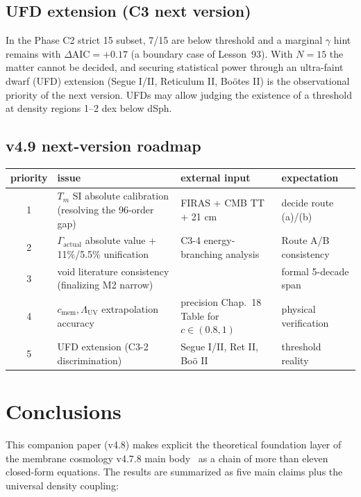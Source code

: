 \documentclass[11pt,a4paper]{article}
\newcommand{\cmem}{c_{\mathrm{mem}}}
\newcommand{\Tm}{T_{m}}
\newcommand{\Lambdauv}{\Lambda_{\mathrm{UV}}}
\newcommand{\Gammaact}{\Gamma_{\mathrm{actual}}}
\newcommand{\AIC}{\Delta\mathrm{AIC}}
\begin{document}
\subsection{UFD extension (C3 next version)}
In the Phase C2 strict 15 subset, 7/15 are below threshold and a marginal $\gamma$ hint remains with
$\AIC = +0.17$ (a boundary case of Lesson~93). With $N = 15$ the matter cannot be decided, and
securing statistical power through an ultra-faint dwarf (UFD) extension (Segue I/II, Reticulum II,
Boötes II) is the observational priority of the next version. UFDs may allow judging the existence
of a threshold at density regions 1--2 dex below dSph.

\subsection{v4.9 next-version roadmap}
\begin{center}\small
\begin{tabularx}{\linewidth}{@{}c >{\raggedright\arraybackslash}X >{\raggedright\arraybackslash}X >{\raggedright\arraybackslash}X@{}}
\toprule
priority & issue & external input & expectation \\
\midrule
1 & $\Tm$ SI absolute calibration (resolving the 96-order gap) & FIRAS + CMB TT + 21 cm & decide route (a)/(b) \\
2 & $\Gammaact$ absolute value + 11\%/5.5\% unification & C3-4 energy-branching analysis & Route A/B consistency \\
3 & void literature consistency (finalizing M2 narrow) & \citet{Kreckel2011, Pan2012} & formal 5-decade span \\
4 & $\cmem, \Lambdauv$ extrapolation accuracy & precision Chap.~18 Table for $c \in (0.8, 1)$ & physical verification \\
5 & UFD extension (C3-2 discrimination) & Segue I/II, Ret II, Bo\"o II & threshold reality \\
\bottomrule
\end{tabularx}
\end{center}

\section{Conclusions}

This companion paper (v4.8) makes explicit the theoretical foundation layer of the membrane
cosmology v4.7.8 main body~\citep{Sakaguchi2026a} as a chain of more than eleven closed-form
equations. The results are summarized as five main claims plus the universal density coupling:
\end{document}
